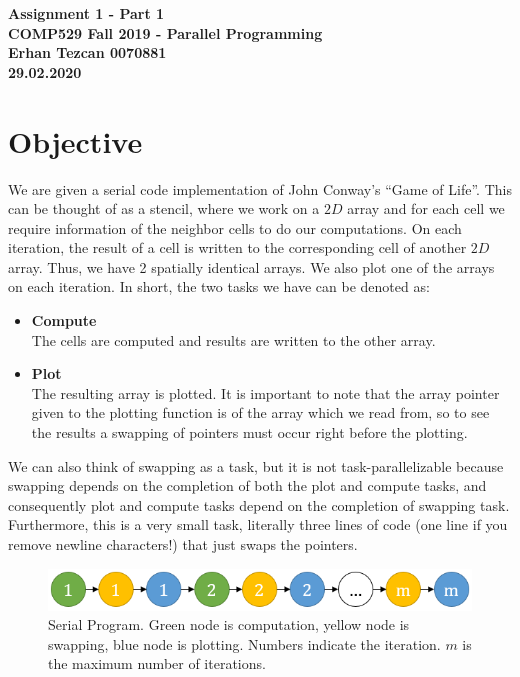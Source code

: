 \documentclass[11pt,reqno]{amsart}
\begin{document}
\begin{center}
\large\textbf{Assignment 1 - Part 1 \\ COMP529 Fall 2019 - Parallel Programming} \\
\normalsize\textbf{Erhan Tezcan 0070881 \\ 29.02.2020} \\
\end{center}

\section{Objective}

We are given a serial code implementation of John Conway's ``Game of Life''. This can be thought of as a stencil, where we work on a $2D$ array and for each cell we require information of the neighbor cells to do our computations. On each iteration, the result of a cell is written to the corresponding cell of another $2D$ array. Thus, we have 2 spatially identical arrays. We also plot one of the arrays on each iteration. In short, the two tasks we have can be denoted as:
\begin{itemize}
	\item \textbf{Compute} \\
	The cells are computed and results are written to the other array.
	\item \textbf{Plot} \\
	The resulting array is plotted. It is important to note that the array pointer given to the plotting function is of the array which we read from, so to see the results a swapping of pointers must occur right before the plotting.
\end{itemize}

We can also think of swapping as a task, but it is not task-parallelizable because swapping depends on the completion of both the plot and compute tasks, and consequently plot and compute tasks depend on the completion of swapping task. Furthermore, this is a very small task, literally three lines of code (one line if you remove newline characters!) that just swaps the pointers.
\begin{figure}[h]
\centering
\label{fig:ser}
\includegraphics[width=0.75\linewidth]{serial_p1.png}
\caption{Serial Program. Green node is computation, yellow node is swapping, blue node is plotting. Numbers indicate the iteration. $m$ is the maximum number of iterations.}
\end{figure}
\end{document}
